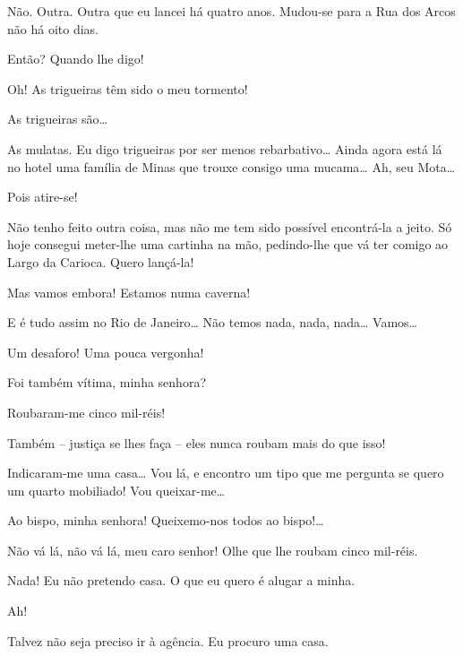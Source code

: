  Não. Outra. Outra que eu lancei há quatro anos. Mudou-se para
a Rua dos Arcos não há oito dias.

 Então? Quando lhe digo!

 Oh! As trigueiras têm sido o meu tormento!

 As trigueiras são\ldots{}

 As mulatas. Eu digo trigueiras por ser menos rebarbativo\ldots{}
Ainda agora está lá no hotel uma família de Minas que trouxe consigo uma
mucama\ldots{} Ah, seu Mota\ldots{}

 Pois atire-se!

 Não tenho feito outra coisa, mas não me tem sido possível
encontrá-la a jeito. Só hoje consegui meter-lhe uma cartinha na mão, pedindo-lhe que
vá ter comigo ao Largo da Carioca. Quero lançá-la!

 Mas vamos embora! Estamos numa caverna!

 E é tudo assim no Rio de Janeiro\ldots{} Não temos nada, nada,
nada\ldots{} Vamos\ldots{}


  Um desaforo! Uma pouca vergonha!

 Foi também vítima, minha senhora?

 Roubaram-me cinco mil-réis!

 Também -- justiça se lhes faça -- eles nunca roubam mais do que
isso!

 Indicaram-me uma casa\ldots{} Vou lá, e encontro um tipo que me
pergunta se quero um quarto mobiliado! Vou queixar-me\ldots{}

 Ao bispo, minha senhora! Queixemo-nos todos ao bispo!\ldots{} 

  Não vá lá, não vá lá, meu caro
senhor! Olhe que lhe roubam cinco mil-réis.

 Nada! Eu não pretendo casa. O que eu quero é alugar a
minha.

 Ah! 

 Talvez não seja preciso ir à agência. Eu procuro uma casa.

